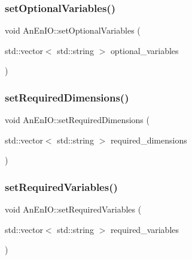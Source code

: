 \subsubsection{\texorpdfstring{set\+Optional\+Variables()}{setOptionalVariables()}}
{\footnotesize\ttfamily void An\+En\+I\+O\+::set\+Optional\+Variables (\begin{DoxyParamCaption}\item[{std\+::vector$<$ std\+::string $>$}]{optional\+\_\+variables }\end{DoxyParamCaption})}

\mbox{\label{class_an_en_i_o_a239ea94b3648006920bcdcded4040ad3}} 
\subsubsection{\texorpdfstring{set\+Required\+Dimensions()}{setRequiredDimensions()}}
{\footnotesize\ttfamily void An\+En\+I\+O\+::set\+Required\+Dimensions (\begin{DoxyParamCaption}\item[{std\+::vector$<$ std\+::string $>$}]{required\+\_\+dimensions }\end{DoxyParamCaption})}

\mbox{\label{class_an_en_i_o_a643c51c346118d8416fa2c2e0da8042a}} 
\subsubsection{\texorpdfstring{set\+Required\+Variables()}{setRequiredVariables()}}
{\footnotesize\ttfamily void An\+En\+I\+O\+::set\+Required\+Variables (\begin{DoxyParamCaption}\item[{std\+::vector$<$ std\+::string $>$}]{required\+\_\+variables }\end{DoxyParamCaption})}

\mbox{\label{class_an_en_i_o_a696dff7bb250fc45b597e5f82e33e23e}} 
